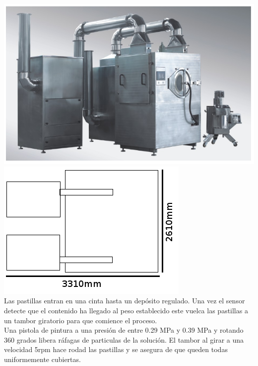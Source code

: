	\includegraphics[scale=0.4]{Datasheets/4Foto.png}\hfill
	\includegraphics[scale=0.6]{Datasheets/Miniaturas/revestimiento.png}\\

	Las pastillas entran en una cinta hasta un depósito regulado. Una vez el sensor detecte que el contenido ha llegado al peso establecido este vuelca las pastillas a un tambor giratorio para que comience el proceso.\\

	Una pistola de pintura a una presión de entre 0.29 MPa y 0.39 MPa y rotando 360 grados libera ráfagas de particulas de la solución. El tambor al girar a una velocidad 5rpm hace rodad las pastillas y se asegura de que queden todas uniformemente cubiertas.\\


